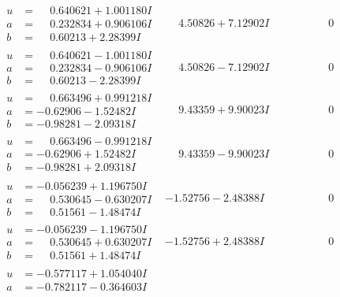 \documentclass[1p]{elsarticle_modified}
\theoremstyle{definition}
\begin{document}
$$\begin{array}{c|c|c}
 \hline 
\begin{aligned}
u &= \phantom{-}0.640621 + 1.001180 I \\
a &= \phantom{-}0.232834 + 0.906106 I \\
b &= \phantom{-}0.60213 + 2.28399 I\end{aligned}
 & \phantom{-}4.50826 + 7.12902 I & \phantom{-0.000000 } 0 \\ \hline\begin{aligned}
u &= \phantom{-}0.640621 - 1.001180 I \\
a &= \phantom{-}0.232834 - 0.906106 I \\
b &= \phantom{-}0.60213 - 2.28399 I\end{aligned}
 & \phantom{-}4.50826 - 7.12902 I & \phantom{-0.000000 } 0 \\ \hline\begin{aligned}
u &= \phantom{-}0.663496 + 0.991218 I \\
a &= -0.62906 - 1.52482 I \\
b &= -0.98281 - 2.09318 I\end{aligned}
 & \phantom{-}9.43359 + 9.90023 I & \phantom{-0.000000 } 0 \\ \hline\begin{aligned}
u &= \phantom{-}0.663496 - 0.991218 I \\
a &= -0.62906 + 1.52482 I \\
b &= -0.98281 + 2.09318 I\end{aligned}
 & \phantom{-}9.43359 - 9.90023 I & \phantom{-0.000000 } 0 \\ \hline\begin{aligned}
u &= -0.056239 + 1.196750 I \\
a &= \phantom{-}0.530645 - 0.630207 I \\
b &= \phantom{-}0.51561 - 1.48474 I\end{aligned}
 & -1.52756 - 2.48388 I & \phantom{-0.000000 } 0 \\ \hline\begin{aligned}
u &= -0.056239 - 1.196750 I \\
a &= \phantom{-}0.530645 + 0.630207 I \\
b &= \phantom{-}0.51561 + 1.48474 I\end{aligned}
 & -1.52756 + 2.48388 I & \phantom{-0.000000 } 0 \\ \hline\begin{aligned}
u &= -0.577117 + 1.054040 I \\
a &= -0.782117 - 0.364603 I \\

\end{aligned}
\end{array}$$
\end{document}
